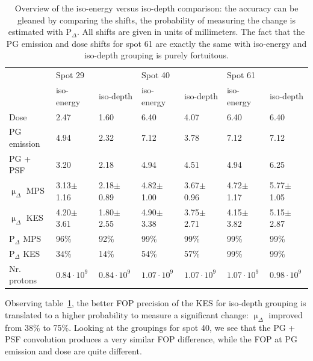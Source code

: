 \documentclass[a4paper,english]{article}
\begin{document}
\begin{table}
\centering
\begin{tabular}{lllllll}
	 & Spot 29 & & Spot 40 & & Spot 61\\
	 & iso-energy & iso-depth & iso-energy & iso-depth & iso-energy & iso-depth \\
	\midrule
	Dose & 2.47 & 1.60 & 6.40 & 4.07 & 6.40 & 6.40 \\
	PG emission & 4.94 & 2.32 & 7.12 & 3.78 & 7.12 & 7.12 \\
	PG + PSF & 3.20 & 2.18 & 4.94 & 4.51 & 4.94 & 6.25 \\
	$\upmu_\Delta$ MPS & 3.13$\pm$1.16 & 2.18$\pm$0.89 & 4.82$\pm$1.00 & 3.67$\pm$0.96 & 4.72$\pm$1.17 & 5.77$\pm$1.05  \\
	$\upmu_\Delta$ KES & 4.20$\pm$3.61 & 1.80$\pm$2.55 & 4.90$\pm$3.38 & 3.75$\pm$2.71 & 4.15$\pm$3.82 & 5.15$\pm$2.87  \\
	\midrule
	P$_\Delta$ MPS & 96\% & 92\%  & 99\% & 99\%  & 99\% & 99\% \\
	P$_\Delta$ KES & 34\% & 14\%  & 54\% & 57\%  & 99\% & 99\%  \\
	\midrule
	Nr. protons & $0.84\cdot10^9$ & $0.84\cdot10^9$ & $1.07\cdot10^9$ & $1.07\cdot10^9$ & $1.07\cdot10^9$ & $0.98\cdot10^9$ \\
\end{tabular}
\caption{Overview of the iso-energy versus iso-depth comparison: the accuracy can be gleaned by comparing the shifts, the probability of measuring the change is estimated with P$_\Delta$. All shifts are given in units of millimeters. The fact that the PG emission and dose shifts for spot 61 are exactly the same with iso-energy and iso-depth grouping is purely fortuitous.}
\label{table:layerresults}
\end{table}

Observing table~\ref{table:layerresults}, the better FOP precision of the KES for iso-depth grouping is translated to a higher probability to measure a significant change: $\upmu_\Delta$ improved from 38\% to 75\%. Looking at the groupings for spot 40, we see that the PG + PSF convolution produces a very similar FOP difference, while the FOP at PG emission and dose are quite different.
\end{document}
